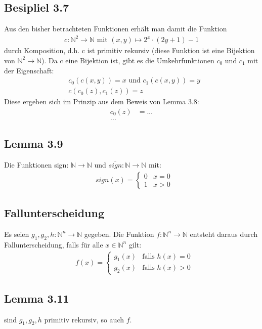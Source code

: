 \subsection{Besipliel 3.7}
Aus den bisher betrachteten Funktionen erhält man damit die Funktion
\begin{align*}
	c: \mathbb{N}^2 \to \mathbb{N} \text{ mit } (x,y) \mapsto 2^x \cdot (2y+1)-1
\end{align*}
durch Komposition, d.h. c ist primitiv rekursiv (diese Funktion ist eine Bijektion von $\mathbb{N}^2 \to \mathbb{N}$).
Da c eine Bijektion ist, gibt es die Umkehrfunktionen $c_0$ und $c_1$ mit der Eigenschaft:
\begin{align*}
	&c_0(c(x,y))= x \text{ und } c_1(c(x,y)) = y\\
	&c(c_0(z), c_1(z)) = z
\end{align*}
Diese ergeben sich im Prinzip aus dem Beweis von Lemma 3.8:
\begin{align*}
	c_0(z) &= ... \\
	...
\end{align*}
\subsection{Lemma 3.9}
Die Funktionen sign: $\mathbb{N} \to \mathbb{N} $ und $\overline{sign}: \mathbb{N} \to \mathbb{N}$ mit:
\begin{align*}
&sign(x) = \begin{cases} 0 &x = 0\\
1 & x > 0 \end{cases}
\end{align*}
\subsection{Fallunterscheidung}
Es seien $g_1, g_2, h : \mathbb{N}^n \to \mathbb{N} $ gegeben. Die Funktion $f:\mathbb{N}^n \to \mathbb{N} $ entsteht daraus durch Fallunterscheidung, falls für alle $x \in \mathbb{N}^n$ gilt:
\begin{align*}
	&f(x) = \begin{cases} g_1(x) &\text{falls } h(x) = 0\\
	g_2(x) &\text{falls } h(x) > 0
	\end{cases}
\end{align*}
\subsection{Lemma 3.11}
sind $g_1, g_2, h$ primitiv rekursiv, so auch $f$.
